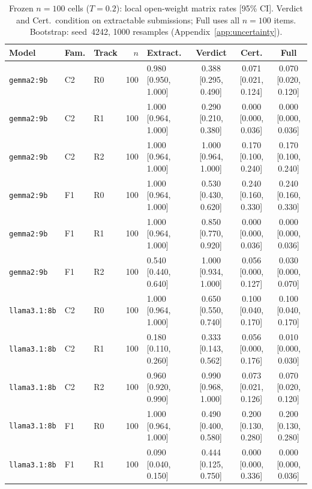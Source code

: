\begin{table}[t]
  \centering
  \caption{Frozen $n{=}100$ cells ($T{=}0.2$): local open-weight matrix rates [95\% CI]. Verdict and Cert.\ condition on extractable submissions; Full uses all $n{=}100$ items. Bootstrap: seed~4242, 1000 resamples (Appendix~\ref{app:uncertainty}).}
  \label{tab:local-matrix-n100-summary}
  \setlength{\tabcolsep}{2pt}
  \begin{tabular}{@{}lllrlccc@{}}
    \toprule
    Model & Fam. & Track & $n$ & Extract. & Verdict & Cert. & Full \\
    \midrule
    \texttt{gemma2:9b} & C2 & R0 & 100 & 0.980 [0.950, 1.000] & 0.388 [0.295, 0.490] & 0.071 [0.021, 0.124] & 0.070 [0.020, 0.120] \\
    \texttt{gemma2:9b} & C2 & R1 & 100 & 1.000 [0.964, 1.000] & 0.290 [0.210, 0.380] & 0.000 [0.000, 0.036] & 0.000 [0.000, 0.036] \\
    \texttt{gemma2:9b} & C2 & R2 & 100 & 1.000 [0.964, 1.000] & 1.000 [0.964, 1.000] & 0.170 [0.100, 0.240] & 0.170 [0.100, 0.240] \\
    \texttt{gemma2:9b} & F1 & R0 & 100 & 1.000 [0.964, 1.000] & 0.530 [0.430, 0.620] & 0.240 [0.160, 0.330] & 0.240 [0.160, 0.330] \\
    \texttt{gemma2:9b} & F1 & R1 & 100 & 1.000 [0.964, 1.000] & 0.850 [0.770, 0.920] & 0.000 [0.000, 0.036] & 0.000 [0.000, 0.036] \\
    \texttt{gemma2:9b} & F1 & R2 & 100 & 0.540 [0.440, 0.640] & 1.000 [0.934, 1.000] & 0.056 [0.000, 0.127] & 0.030 [0.000, 0.070] \\
    \texttt{llama3.1:8b} & C2 & R0 & 100 & 1.000 [0.964, 1.000] & 0.650 [0.550, 0.740] & 0.100 [0.040, 0.170] & 0.100 [0.040, 0.170] \\
    \texttt{llama3.1:8b} & C2 & R1 & 100 & 0.180 [0.110, 0.260] & 0.333 [0.143, 0.562] & 0.056 [0.000, 0.176] & 0.010 [0.000, 0.030] \\
    \texttt{llama3.1:8b} & C2 & R2 & 100 & 0.960 [0.920, 0.990] & 0.990 [0.968, 1.000] & 0.073 [0.021, 0.126] & 0.070 [0.020, 0.120] \\
    \texttt{llama3.1:8b} & F1 & R0 & 100 & 1.000 [0.964, 1.000] & 0.490 [0.400, 0.580] & 0.200 [0.130, 0.280] & 0.200 [0.130, 0.280] \\
    \texttt{llama3.1:8b} & F1 & R1 & 100 & 0.090 [0.040, 0.150] & 0.444 [0.125, 0.750] & 0.000 [0.000, 0.336] & 0.000 [0.000, 0.036] \\

\end{tabular}
\end{table}
